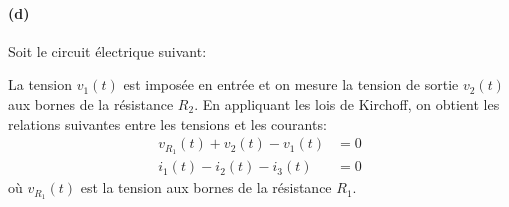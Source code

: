 \paragraph{(d)}
\begin{center}
    
\end{center}
\clearpage
Soit le circuit électrique suivant:
\begin{center}
    
\end{center}
La tension $v_1(t)$ est imposée en entrée et on mesure la tension de sortie 
$v_2(t)$ aux bornes de la résistance $R_2$.
En appliquant les lois de Kirchoff, on obtient les relations suivantes 
entre les tensions et les courants:
\begin{align*}
    v_{R_1}(t)+v_2(t)-v_1(t)&=0\\
    i_1(t)-i_2(t)-i_3(t)&=0
\end{align*}
où  $v_{R_1}(t)$ est la tension aux bornes de la résistance $R_1$.

